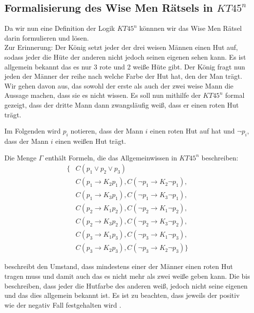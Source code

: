 \subsection{Formalisierung des Wise Men Rätsels in $KT45^n$}
Da wir nun eine Definition der Logik $KT45^n$ könnnen wir das Wise Men Rätsel darin formulieren und lösen.\\
Zur Erinnerung: Der König setzt jeder der drei weisen Männen einen Hut auf, sodass jeder die Hüte der anderen nicht jedoch seinen eigenen sehen kann.
Es ist allgemein bekannt das es nur 3 rote und 2 weiße Hüte gibt.
Der König fragt nun jeden der Männer der reihe nach welche Farbe der Hut hat, den der Man trägt.
Wir gehen davon aus, das sowohl der erste als auch der zwei weise Mann die Aussage machen, dass sie es nicht wissen.
Es soll nun mithilfe der $KT45^n$ formal gezeigt, dass der dritte Mann dann zwangsläufig weiß, dass er einen roten Hut trägt.

Im Folgenden wird $p_i$ notieren, dass der Mann $i$ einen roten Hut auf hat und 
$\neg p_i$, dass der Mann $i$ einen weißen Hut trägt.

Die Menge $\Gamma$ enthält Formeln, die das Allgemeinwissen in $KT45^n$ beschreiben:
\begin{subequations}
	\begin{align}
		\{&C(p_1 \vee p_2 \vee p_3) \label{eq:min_ein_roter_hut}\\
		\label{eq:zweiter_kennt_farbe_von_erster}
		&C(p_1 \rightarrow K_2 p_1), C(\neg p_1 \rightarrow K_2 \neg p_1),\\
		&C(p_1 \rightarrow K_3 p_1), C(\neg p_1 \rightarrow K_3 \neg p_1),\\
		&C(p_2 \rightarrow K_1 p_2), C(\neg p_2 \rightarrow K_1 \neg p_2),\\
		&C(p_2 \rightarrow K_3 p_2), C(\neg p_2 \rightarrow K_3 \neg p_2),\\
		&C(p_3 \rightarrow K_1 p_3), C(\neg p_3 \rightarrow K_1 \neg p_3),\\
		\label{eq:zweiter_kennt_farbe_von_letzter}
		&C(p_3 \rightarrow K_2 p_3), C(\neg p_3 \rightarrow K_2 \neg p_3)\}
	\end{align}
\end{subequations}

 beschreibt den Umstand, dass mindestens einer der Männer einen roten Hut tragen muss und damit auch das es nicht mehr als zwei weiße geben kann.
Die  bis  beschreiben, dass jeder die Hutfarbe des anderen weiß, jedoch nicht seine eigenen und das dies allgemein bekannt ist.
Es ist zu beachten, dass jeweils der positiv wie der negativ Fall festgehalten wird .

